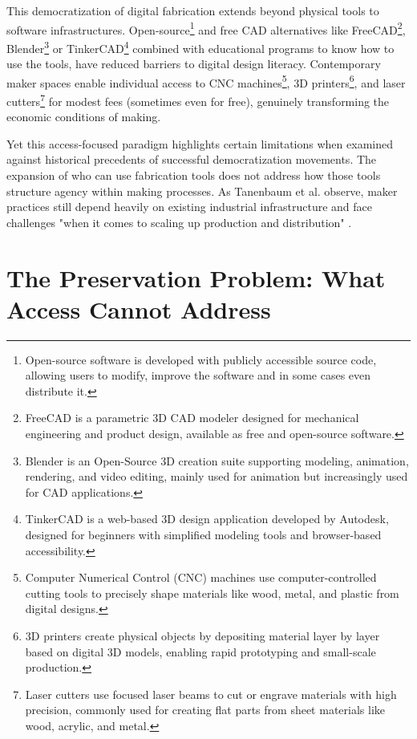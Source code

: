 This democratization of digital fabrication extends beyond physical tools to software infrastructures. Open-source\footnote{Open-source software is developed with publicly accessible source code, allowing users to modify, improve the software and in some cases even distribute it.} and free CAD alternatives like FreeCAD\footnote{FreeCAD is a parametric 3D CAD modeler designed for mechanical engineering and product design, available as free and open-source software.}, Blender\footnote{Blender is an Open-Source 3D creation suite supporting modeling, animation, rendering, and video editing, mainly used for animation but increasingly used for CAD applications.} or TinkerCAD\footnote{TinkerCAD is a web-based 3D design application developed by Autodesk, designed for beginners with simplified modeling tools and browser-based accessibility.} combined with educational programs to know how to use the tools, have reduced barriers to digital design literacy. Contemporary maker spaces enable individual access to CNC machines\footnote{Computer Numerical Control (CNC) machines use computer-controlled cutting tools to precisely shape materials like wood, metal, and plastic from digital designs.}, 3D printers\footnote{3D printers create physical objects by depositing material layer by layer based on digital 3D models, enabling rapid prototyping and small-scale production.}, and laser cutters\footnote{Laser cutters use focused laser beams to cut or engrave materials with high precision, commonly used for creating flat parts from sheet materials like wood, acrylic, and metal.} for modest fees (sometimes even for free), genuinely transforming the economic conditions of making.

\vspace{0.5cm}

Yet this access-focused paradigm highlights certain limitations when examined against historical precedents of successful democratization movements. The expansion of who can use fabrication tools does not address how those tools structure agency within making processes. As Tanenbaum et al. observe, maker practices still depend heavily on existing industrial infrastructure and face challenges "when it comes to scaling up production and distribution" \citep{tanenbaum2013}.

\section{The Preservation Problem: What Access Cannot Address}

